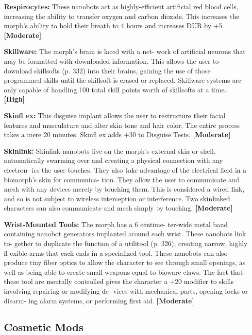\textbf{Respirocytes:} These nanobots act as highly-efficient 
artificial red blood cells, increasing the ability to 
transfer oxygen and carbon dioxide. This increases 
the morph's ability to hold their breath to 4 hours 
and increases DUR by +5. \textbf{[Moderate]}

\textbf{Skillware: }The morph's brain is laced with a net-
work of artificial neurons that may be formatted with 
downloaded information. This allows the user to 
download skillsofts (p. 332) into their brains, gaining 
the use of those programmed skills until the skillsoft 
is erased or replaced. Skillware systems are only 
capable of handling 100 total skill points worth of 
skillsofts at a time. \textbf{[High]}

\textbf{Skinfl ex: }This disguise implant allows the user to 
restructure their facial features and musculature and 
alter skin tone and hair color. The entire process takes 
a mere 20 minutes. Skinfl ex adds +30 to Disguise 
Tests. \textbf{[Moderate]}

\textbf{Skinlink:} Skinlink nanobots live on the morph's 
external skin or shell, automatically swarming over 
and creating a physical connection with any electron-
ics the user touches. They also take advantage of the 
electrical field in a biomorph's skin for communica-
tion. They allow the user to communicate and mesh 
with any devices merely by touching them. This 
is considered a wired link, and so is not subject to 
wireless interception or interference. Two skinlinked 
characters can also communicate and mesh simply by 
touching. \textbf{[Moderate]}

\textbf{Wrist-Mounted Tools: }The morph has a 6 centime-
ter-wide metal band containing nanobot generators 
implanted around each wrist. These nanobots link to-
gether to duplicate the function of a utilitool (p. 326), 
creating narrow, highly fl exible arms that each ends in 
a specialized tool. These nanobots can also produce 
tiny fiber optics to allow the character to see through 
small openings, as well as being able to create small 
weapons equal to bioware claws. The fact that these 
tool are mentally controlled gives the character a +20 
modifier to skills involving repairing or modifying de-
vices with mechanical parts, opening locks or disarm-
ing alarm systems, or performing first aid. \textbf{[Moderate]}

\subsection{Cosmetic Mods}


